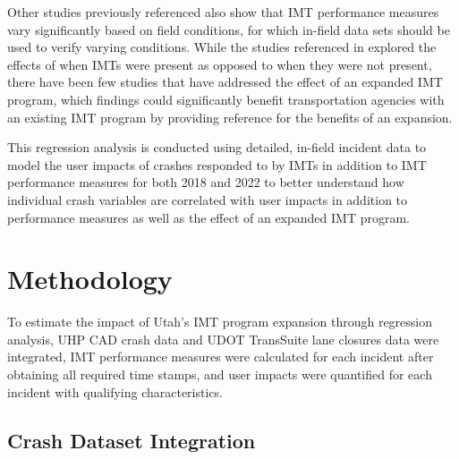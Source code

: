\documentclass[
  letterpaper,
  authoryear]{elsarticle}
\begin{document}
Other studies previously referenced also show that IMT performance
measures vary significantly based on field conditions, for which
in-field data sets should be used to verify varying conditions. While
the studies referenced in \citet{shah_development_2022} explored the
effects of when IMTs were present as opposed to when they were not
present, there have been few studies that have addressed the effect of
an expanded IMT program, which findings could significantly benefit
transportation agencies with an existing IMT program by providing
reference for the benefits of an expansion.

This regression analysis is conducted using detailed, in-field incident
data to model the user impacts of crashes responded to by IMTs in
addition to IMT performance measures for both 2018 and 2022 to better
understand how individual crash variables are correlated with user
impacts in addition to performance measures as well as the effect of an
expanded IMT program.


\section{Methodology}\label{methodology}

To estimate the impact of Utah's IMT program expansion through
regression analysis, UHP CAD crash data and UDOT TransSuite lane
closures data were integrated, IMT performance measures were calculated
for each incident after obtaining all required time stamps, and user
impacts were quantified for each incident with qualifying
characteristics.

\subsection{Crash Dataset Integration}\label{crash-dataset-integration}
\end{document}
